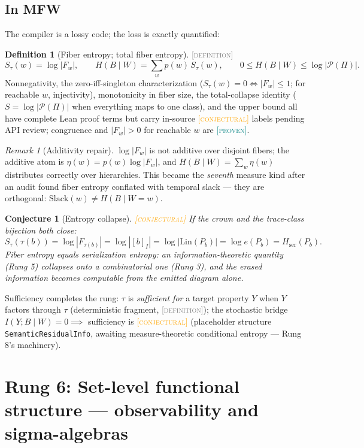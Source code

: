 \documentclass[11pt]{article}
\newcommand{\PROVEN}{\textcolor{teal}{\textsc{[proven]}}}
\newcommand{\DEFINITION}{\textcolor{gray}{\textsc{[definition]}}}
\newcommand{\CONJECTURAL}{\textcolor{orange}{\textsc{[conjectural]}}}
\newcommand{\PT}{\Pi}
\newcommand{\PS}{\mathcal{P}(\PT)}
\newcommand{\fib}[1]{F_{#1}}
\newcommand{\Lin}{\mathrm{Lin}}
\newcommand{\Hser}{H_{\mathrm{ser}}}
\theoremstyle{plain}
\newtheorem{conjecture}[theorem]{Conjecture}
\theoremstyle{definition}
\newtheorem{definition}[theorem]{Definition}
\theoremstyle{remark}
\newtheorem{remark}[theorem]{Remark}
\begin{document}
\subsection{In MFW}
The compiler is a lossy code; the loss is exactly quantified:
\begin{definition}[Fiber entropy; total fiber entropy]\DEFINITION\;
\[
  S_\tau(w) = \log|\fib{w}|, \qquad
  H(B \mid W) = \sum_w p(w)\, S_\tau(w), \qquad
  0 \le H(B \mid W) \le \log|\PS|.
\]
Nonnegativity, the zero-iff-singleton characterization
($S_\tau(w) = 0 \iff |\fib{w}| \le 1$; for reachable $w$, injectivity),
monotonicity in fiber size, the total-collapse identity
($S = \log|\PS|$ when everything maps to one class), and the upper bound
all have complete Lean proof terms but carry in-source \CONJECTURAL{}
labels pending API review; congruence and $|\fib{w}| > 0$ for reachable
$w$ are \PROVEN.
\end{definition}

\begin{remark}[Additivity repair]
$\log|\fib{w}|$ is not additive over disjoint fibers; the additive atom is
$\eta(w) = p(w) \log|\fib{w}|$, and $H(B \mid W) = \sum_w \eta(w)$
distributes correctly over hierarchies. This became the \emph{seventh}
measure kind after an audit found fiber entropy conflated with temporal
slack --- they are orthogonal: $\mathrm{Slack}(w) \ne H(B \mid W = w)$.
\end{remark}

\begin{conjecture}[Entropy collapse]\CONJECTURAL\;
If the crown and the trace-class bijection both close:
\[
  S_\tau(\tau(b)) = \log|\fib{\tau(b)}| = \log|[b]_I|
  = \log|\Lin(P_b)| = \log e(P_b) = \Hser(P_b).
\]
Fiber entropy \emph{equals} serialization entropy: an information-theoretic
quantity (Rung 5) collapses onto a combinatorial one (Rung 3), and the
erased information becomes computable from the emitted diagram alone.
\end{conjecture}

Sufficiency completes the rung: $\tau$ is \emph{sufficient for} a target
property $Y$ when $Y$ factors through $\tau$ (deterministic fragment,
\DEFINITION); the stochastic bridge $I(Y; B \mid W) = 0 \implies$
sufficiency is \CONJECTURAL{} (placeholder structure
\texttt{SemanticResidualInfo}, awaiting measure-theoretic conditional
entropy --- Rung 8's machinery).

\section{Rung 6: Set-level functional structure --- observability and
sigma-algebras}
\label{sec:rung6}
\end{document}

